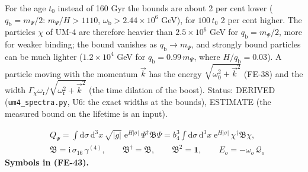 \documentclass[
  10pt,
]{article}
\begin{document}
For the age \(t_0\) instead of 160 Gyr the bounds are about 2 per cent
lower (\(q_{\mathrm{b}} = m_\Psi/2\): \(m_\Psi/H > 1110\),
\(\omega_{\mathrm{b}} > 2.44\times10^6\) GeV), for \(100\,t_0\) 2 per
cent higher. The particles \(\chi\) of UM-4 are therefore heavier than
\(2.5\times10^6\) GeV for \(q_{\mathrm{b}} = m_\Psi/2\), more for weaker
binding; the bound vanishes as \(q_{\mathrm{b}} \to m_\Psi\), and
strongly bound particles can be much lighter (\(1.2\times10^4\) GeV for
\(q_{\mathrm{b}} = 0.99\,m_\Psi\), where \(H/q_{\mathrm{b}} = 0.03\)). A
particle moving with the momentum \(\vec k\) has the energy
\(\sqrt{\omega_0^2 + \vec k^2}\) (FE-38) and the width
\(\Gamma_\chi\omega_{\mathrm{r}}/\sqrt{\omega_{\mathrm{r}}^2 + \vec k^2}\)
(the time dilation of the boost). Status: DERIVED
(\texttt{um4\_spectra.py}, U6: the exact widths at the bounds), ESTIMATE
(the measured bound on the lifetime is an input).

\[
\begin{aligned}
&Q_\Psi = \int\mathrm{d}\sigma\,\mathrm{d}^3x\,\sqrt{\lvert g\rvert}\;\mathrm{e}^{H\lvert\sigma\rvert}\,\Psi^\dagger\mathfrak{B}\Psi
 = b_4^3\int\mathrm{d}\sigma\,\mathrm{d}^3x\;\mathrm{e}^{H\lvert\sigma\rvert}\,\chi^\dagger\mathfrak{B}\chi,\\
&\mathfrak{B} = \mathrm{i}\,\sigma_{16}\,\gamma^{(4)},\qquad \mathfrak{B}^\dagger = \mathfrak{B},\qquad \mathfrak{B}^2 = \mathbf{1},\qquad
E_o = -\omega_o\,\mathcal{Q}_o
\end{aligned} \tag{FE-43}
\] \textbf{Symbols in (FE-43).}
\end{document}
